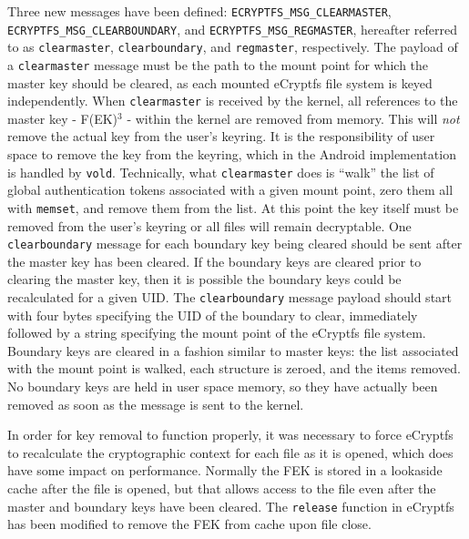 Three new messages have been defined: \texttt{ECRYPTFS\_MSG\_CLEARMASTER}, \texttt{ECRYPTFS\_MSG\_CLEARBOUNDARY}, and
\texttt{ECRYPTFS\_MSG\_REGMASTER}, hereafter referred to as \texttt{clearmaster}, \texttt{clearboundary}, and \texttt{regmaster},
respectively. The payload of a \texttt{clearmaster} message must be the path to the mount point for which the master key should be
cleared, as each mounted eCryptfs file system is keyed independently. When \texttt{clearmaster} is received by the kernel, all
references to the master key - F(EK)$^{3}$ - within the kernel are removed from memory. This will \emph{not} remove the
actual key from the user's keyring. It is the responsibility of user space to remove the key from the keyring, which in the Android
implementation is handled by \texttt{vold}.  Technically, what \texttt{clearmaster} does is ``walk'' the list of global
authentication tokens associated with a given mount point, zero them all with \texttt{memset}, and remove them from the list.  At
this point the key itself must be removed from the user's keyring or all files will remain decryptable. One \texttt{clearboundary}
message for each boundary key being cleared should be sent after the master key has been cleared. If the boundary keys are cleared
prior to clearing the master key, then it is possible the boundary keys could be recalculated for a given UID. The
\texttt{clearboundary} message payload should start with four bytes specifying the UID of the boundary to clear, immediately
followed by a string specifying the mount point of the eCryptfs file system. Boundary keys are cleared in a fashion similar to master
keys: the list associated with the mount point is walked, each structure is zeroed, and the items removed.  No boundary keys are
held in user space memory, so they have actually been removed as soon as the message is sent to the kernel. 

In order for key removal to function properly, it was necessary to force eCryptfs to recalculate the cryptographic context for
each file as it is opened, which does have some impact on performance. Normally the FEK is stored in a lookaside cache after the
file is opened, but that allows access to the file even after the master and boundary keys have been cleared. The \texttt{release}
function in eCryptfs has been modified to remove the FEK from cache upon file close.


